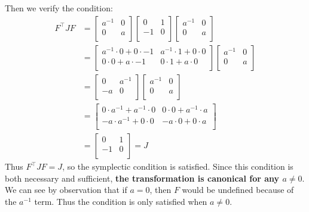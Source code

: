 \documentclass[titlepage]{article}
\begin{document}
\begin{mdframed}[linewidth=1pt, innertopmargin=10pt, innerbottommargin=10pt]
	Then we verify the condition:
	\begin{equation}
		\begin{split}
			F^\top JF&=
			\begin{bmatrix}
				a^{-1} & 0 \\
				0 & a \\
			\end{bmatrix}
			\begin{bmatrix}
				0 & 1 \\
				-1 & 0 \\
			\end{bmatrix}
			\begin{bmatrix}
				a^{-1} & 0 \\
				0 & a \\
			\end{bmatrix} \\
			&=
			\begin{bmatrix}
				a^{-1}\cdot0+0\cdot-1 & a^{-1}\cdot1+0\cdot0 \\
				0\cdot0+a\cdot-1 & 0\cdot1+a\cdot0 \\
			\end{bmatrix}
			\begin{bmatrix}
				a^{-1} & 0 \\
				0 & a \\
			\end{bmatrix} \\
			&=
			\begin{bmatrix}
				0 & a^{-1} \\
				-a & 0 \\
			\end{bmatrix}
			\begin{bmatrix}
				a^{-1} & 0 \\
				0 & a \\
			\end{bmatrix} \\
			&=
			\begin{bmatrix}
				0\cdot a^{-1}+a^{-1}\cdot0 & 0\cdot0+a^{-1}\cdot a \\
				-a\cdot a^{-1}+0\cdot0 & -a\cdot0+0\cdot a \\
			\end{bmatrix} \\
			&=
			\begin{bmatrix}
				0 & 1 \\
				-1 & 0 \\
			\end{bmatrix}=J
		\end{split}
	\end{equation}
	Thus $F^\top JF=J$, so the symplectic condition is satisfied. Since this condition is both necessary and sufficient, \textbf{the transformation is canonical for any $a\neq0$}. We can see by observation that if $a=0$, then $F$ would be undefined because of the $a^{-1}$ term. Thus the condition is only satisfied when $a\neq0$.
\end{mdframed}
\end{document}
